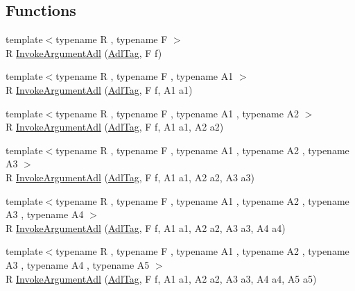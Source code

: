 \subsection*{Functions}
\begin{DoxyCompactItemize}
\item 
{\footnotesize template$<$typename R , typename F $>$ }\\R \hyperlink{namespacetesting_1_1internal_1_1invoke__argument_a003f0228357c54422037bd3b448b355a}{Invoke\+Argument\+Adl} (\hyperlink{structtesting_1_1internal_1_1invoke__argument_1_1AdlTag}{Adl\+Tag}, F f)
\item 
{\footnotesize template$<$typename R , typename F , typename A1 $>$ }\\R \hyperlink{namespacetesting_1_1internal_1_1invoke__argument_af07db25fc1b7486fb991495863bf1ab8}{Invoke\+Argument\+Adl} (\hyperlink{structtesting_1_1internal_1_1invoke__argument_1_1AdlTag}{Adl\+Tag}, F f, A1 a1)
\item 
{\footnotesize template$<$typename R , typename F , typename A1 , typename A2 $>$ }\\R \hyperlink{namespacetesting_1_1internal_1_1invoke__argument_afe4a6811c2bcd0c6c51194b95e224f73}{Invoke\+Argument\+Adl} (\hyperlink{structtesting_1_1internal_1_1invoke__argument_1_1AdlTag}{Adl\+Tag}, F f, A1 a1, A2 a2)
\item 
{\footnotesize template$<$typename R , typename F , typename A1 , typename A2 , typename A3 $>$ }\\R \hyperlink{namespacetesting_1_1internal_1_1invoke__argument_ae5e7bcffcae6a29e9c66298ead5ee91b}{Invoke\+Argument\+Adl} (\hyperlink{structtesting_1_1internal_1_1invoke__argument_1_1AdlTag}{Adl\+Tag}, F f, A1 a1, A2 a2, A3 a3)
\item 
{\footnotesize template$<$typename R , typename F , typename A1 , typename A2 , typename A3 , typename A4 $>$ }\\R \hyperlink{namespacetesting_1_1internal_1_1invoke__argument_aace931066a0efe189d7a0c69f06b74ec}{Invoke\+Argument\+Adl} (\hyperlink{structtesting_1_1internal_1_1invoke__argument_1_1AdlTag}{Adl\+Tag}, F f, A1 a1, A2 a2, A3 a3, A4 a4)
\item 
{\footnotesize template$<$typename R , typename F , typename A1 , typename A2 , typename A3 , typename A4 , typename A5 $>$ }\\R \hyperlink{namespacetesting_1_1internal_1_1invoke__argument_a371c08ae03d150520e8bda58fb4574c3}{Invoke\+Argument\+Adl} (\hyperlink{structtesting_1_1internal_1_1invoke__argument_1_1AdlTag}{Adl\+Tag}, F f, A1 a1, A2 a2, A3 a3, A4 a4, A5 a5)

\end{DoxyCompactItemize}
